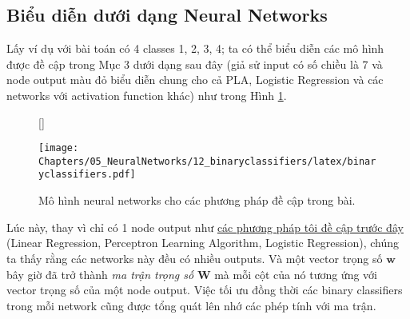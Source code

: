  
 
 
\subsection{Biểu diễn dưới dạng Neural Networks}
Lấy ví dụ với bài toán có 4 classes 1, 2, 3, 4; ta có thể biểu diễn các mô hình được đề cập trong Mục 3 dưới dạng sau đây (giả sử input có số chiều là 7 và node output màu đỏ biểu diễn chung cho cả PLA, Logistic Regression và các networks với activation function khác) như trong Hình \ref{fig:12_6}.
 

\begin{figure}[t]
    [\FBwidth]
    {\caption{ 
    Mô hình neural networks cho các phương pháp đề cập trong bài.
    }
    \label{fig:12_6}}
    { %
    \texttt{[image: Chapters/05\_NeuralNetworks/12\_binaryclassifiers/latex/binaryclassifiers.pdf]}
    }
\end{figure}

Lúc này, thay vì chỉ có 1 node output như \href{http://machinelearningcoban.com/2017/01/27/logisticregression/#-thao-luan}{các phương pháp tôi đề cập trước đây} (Linear Regression, Perceptron Learning Algorithm, Logistic Regression), chúng ta thấy rằng các networks này đều có nhiều outputs. Và một vector trọng số $\mathbf{w}$ bây giờ đã trở thành \textit{ma trận trọng số} $\mathbf{W}$ mà mỗi cột của nó tương ứng với vector trọng số của một node output. Việc tối ưu đồng thời các binary classifiers trong mỗi network cũng được tổng quát lên nhớ các phép tính với ma trận.  
 
